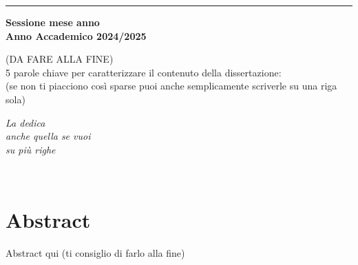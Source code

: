 \documentclass[12pt,a4paper,twoside]{book}
\begin{document}
\begin{titlepage}
\vspace{30mm}

\rule[0.5cm]{15.8cm}{0.6mm}

\begin{center}
{\large{\bf Sessione mese anno \\}}
{\large{\bf Anno Accademico 2024/2025\\}}
\end{center}

\end{titlepage}

\restoregeometry
\newpage
\begin{center}
    (DA FARE ALLA FINE)\\
    5 parole chiave per caratterizzare il contenuto della dissertazione:\\ (se non ti piacciono così sparse puoi anche semplicamente scriverle su una riga sola)
\end{center}

\newpage

\topmargin=6.5cm
\begin{flushright}
\emph{
\LARGE{La dedica}\\\vspace{2mm}
\LARGE{anche quella se vuoi}\\\vspace{3mm} 
\LARGE{su più righe} 
}
\end{flushright}
\newpage~\newpage
{}
\chapter*{Abstract}
Abstract qui (ti consiglio di farlo alla fine)

\topmargin=-1cm
\tableofcontents
\thispagestyle{empty}
\listoftables
\thispagestyle{empty}
\listoffigures
\thispagestyle{empty}
\newpage~\newpage


\setcounter{chapter}{-1}
\raggedbottom
\end{document}
